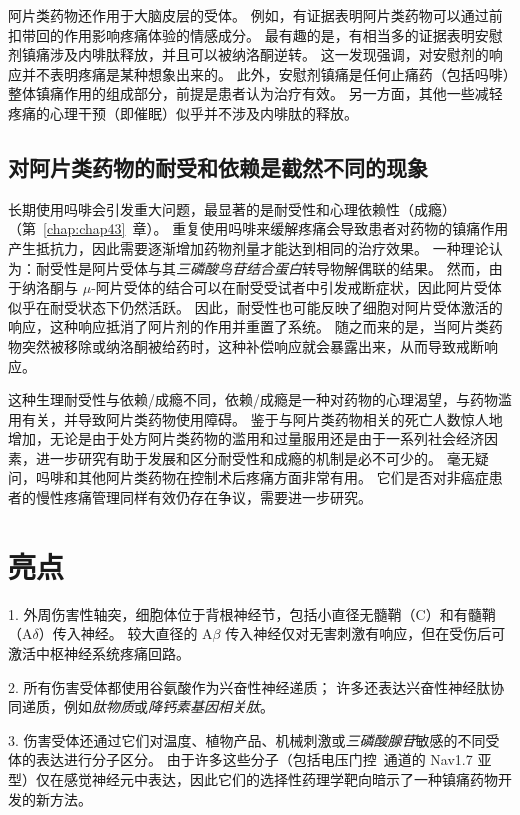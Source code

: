 阿片类药物还作用于大脑皮层的受体。
例如，有证据表明阿片类药物可以通过前扣带回的作用影响疼痛体验的情感成分。
最有趣的是，有相当多的证据表明安慰剂镇痛涉及内啡肽释放，并且可以被纳洛酮逆转。
这一发现强调，对安慰剂的响应并不表明疼痛是某种想象出来的。
此外，安慰剂镇痛是任何止痛药（包括吗啡）整体镇痛作用的组成部分，前提是患者认为治疗有效。
另一方面，其他一些减轻疼痛的心理干预（即催眠）似乎并不涉及内啡肽的释放。



\subsection{对阿片类药物的耐受和依赖是截然不同的现象}

长期使用吗啡会引发重大问题，最显著的是耐受性和心理依赖性（成瘾）（第~\ref{chap:chap43}~章）。
重复使用吗啡来缓解疼痛会导致患者对药物的镇痛作用产生抵抗力，因此需要逐渐增加药物剂量才能达到相同的治疗效果。
一种理论认为：耐受性是阿片受体与其\textit{三磷酸鸟苷结合蛋白}转导物解偶联的结果。
然而，由于纳洛酮与 $\mu$-阿片受体的结合可以在耐受受试者中引发戒断症状，因此阿片受体似乎在耐受状态下仍然活跃。
因此，耐受性也可能反映了细胞对阿片受体激活的响应，这种响应抵消了阿片剂的作用并重置了系统。
随之而来的是，当阿片类药物突然被移除或纳洛酮被给药时，这种补偿响应就会暴露出来，从而导致戒断响应。


这种生理耐受性与依赖/成瘾不同，依赖/成瘾是一种对药物的心理渴望，与药物滥用有关，并导致阿片类药物使用障碍。
鉴于与阿片类药物相关的死亡人数惊人地增加，无论是由于处方阿片类药物的滥用和过量服用还是由于一系列社会经济因素，进一步研究有助于发展和区分耐受性和成瘾的机制是必不可少的。
毫无疑问，吗啡和其他阿片类药物在控制术后疼痛方面非常有用。
它们是否对非癌症患者的慢性疼痛管理同样有效仍存在争议，需要进一步研究。



\section{亮点}

1. 外周伤害性轴突，细胞体位于背根神经节，包括小直径无髓鞘（C）和有髓鞘（A$\delta$）传入神经。
较大直径的 A$\beta$ 传入神经仅对无害刺激有响应，但在受伤后可激活中枢神经系统疼痛回路。 


2. 所有伤害受体都使用谷氨酸作为兴奋性神经递质； 许多还表达兴奋性神经肽协同递质，例如\textit{肽物质}或\textit{降钙素基因相关肽}。


3. 伤害受体还通过它们对温度、植物产品、机械刺激或\textit{三磷酸腺苷}敏感的不同受体的表达进行分子区分。
由于许多这些分子（包括电压门控~通道的 Nav1.7 亚型）仅在感觉神经元中表达，因此它们的选择性药理学靶向暗示了一种镇痛药物开发的新方法。


